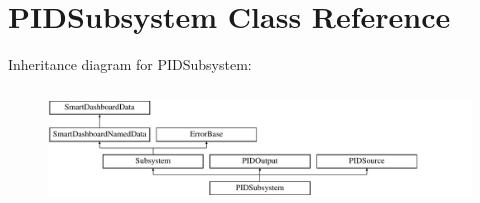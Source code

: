 \hypertarget{classPIDSubsystem}{
\section{PIDSubsystem Class Reference}
\label{classPIDSubsystem}
}
Inheritance diagram for PIDSubsystem:\begin{figure}[H]
\begin{center}
\leavevmode
\includegraphics[height=3.128492cm]{classPIDSubsystem}
\end{center}
\end{figure}
